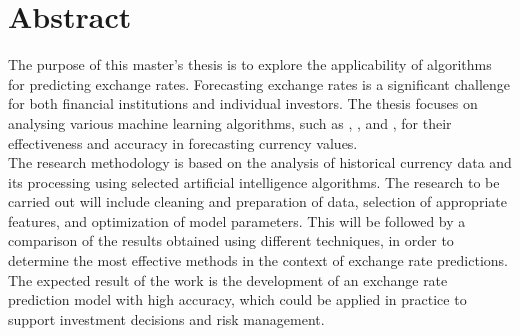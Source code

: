 \section*{Abstract}\label{Abstract}

The purpose of this master's thesis is to explore the applicability of  algorithms for predicting exchange rates. Forecasting exchange rates is a significant challenge for both financial institutions and individual investors. The thesis focuses on analysing various machine learning algorithms, such as , , and , for their effectiveness and accuracy in forecasting currency values.\\

The research methodology is based on the analysis of historical currency data and its processing using selected artificial intelligence algorithms. The research to be carried out will include cleaning and preparation of data, selection of appropriate features, and optimization of model parameters. This will be followed by a comparison of the results obtained using different techniques, in order to determine the most effective methods in the context of exchange rate predictions.\\

The expected result of the work is the development of an exchange rate prediction model with high accuracy, which could be applied in practice to support investment decisions and risk management.
